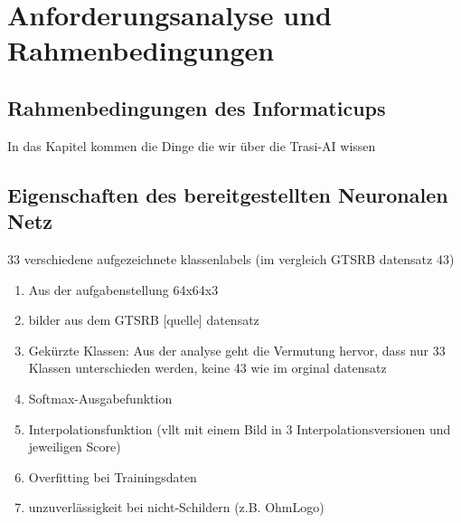 \chapter{Anforderungsanalyse und Rahmenbedingungen}
\label{cha:AnfAnalyse}


\section{Rahmenbedingungen des Informaticups}
In das Kapitel kommen die Dinge die wir über die Trasi-AI wissen
\section{Eigenschaften des bereitgestellten Neuronalen Netz}
\label{sec:TrainingsDaten}




33 verschiedene aufgezeichnete klassenlabels (im vergleich GTSRB datensatz 43)

\begin{enumerate}
	\item 
	Aus der aufgabenstellung 64x64x3
	\item 
	bilder aus dem GTSRB [quelle] datensatz
	\item Gekürzte Klassen: Aus der analyse geht die Vermutung hervor, dass nur 33 Klassen unterschieden werden, keine 43 wie im orginal datensatz
	\item Softmax-Ausgabefunktion 
	\item Interpolationsfunktion (vllt mit einem Bild in 3 Interpolationsversionen und jeweiligen Score) 
	\item Overfitting bei Trainingsdaten
	\item unzuverlässigkeit bei nicht-Schildern (z.B. OhmLogo)
\end{enumerate}



